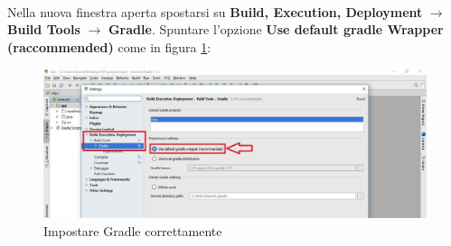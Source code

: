 \documentclass[../ManualeSviluppatore.tex]{subfiles}
\begin{document}
		\paragraph*{}
			Nella nuova finestra aperta spostarsi su \textbf{Build, Execution, Deployment} $\rightarrow$ \textbf{Build Tools} $\rightarrow$ \textbf{Gradle}. Spuntare l'opzione \textbf{Use default gradle \gls{Wrapper} (raccommended)} come in figura \ref{fig:SetGradle}:
			
			\begin{figure} [h]
				\centering
				\includegraphics[width=\textwidth]{img/SetGradle}
				\caption{Impostare Gradle correttamente}
				\label{fig:SetGradle}
			\end{figure}
		
\end{document}
